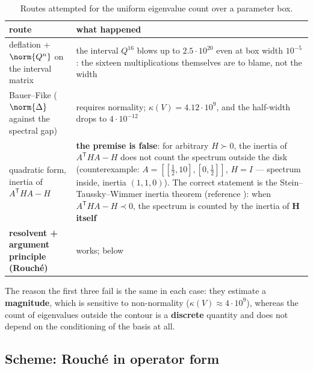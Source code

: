 \begin{table}[ht]
\centering
\caption{Routes attempted for the uniform eigenvalue count over a parameter box.}
\label{tab:routes}
\begin{tabular}{@{}p{}p{}@{}}
\toprule
route & what happened \\
\midrule
deflation + $\norm{Q^{n}}$ on the interval matrix &
the interval $Q^{16}$ blows up to $2.5\cdot 10^{20}$ even at box width
$10^{-5}$: the sixteen multiplications themselves are to blame, not the
width \\
\addlinespace
Bauer--Fike ($\norm{\Delta}$ against the spectral gap) &
requires normality; $\kappa(V) = 4.12\cdot 10^{9}$, and the half-width
drops to $4\cdot 10^{-12}$ \\
\addlinespace
quadratic form, inertia of $A^{\mathsf{T}}HA - H$ &
\textbf{the premise is false}: for arbitrary $H \succ 0$, the inertia of
$A^{\mathsf{T}}HA - H$ does not count the spectrum outside the disk
(counterexample: $A = [[\tfrac{1}{2},10],[0,\tfrac{1}{2}]]$,
$H = I$ --- spectrum inside, inertia $(1,1,0)$). The correct statement is
the Stein--Taussky--Wimmer inertia theorem (reference \cite{stein1952theorems, taussky1964matrices, wimmer1973ostrowski, horn1991topics}): when
$A^{\mathsf{T}}HA - H \prec 0$, the spectrum is counted by the inertia of
$\mathbf{H}$ \textbf{itself} \\
\addlinespace
\textbf{resolvent + argument principle (Rouché)} &
works; below \\
\bottomrule
\end{tabular}
\end{table}

The reason the first three fail is the same in each case: they estimate a
\textbf{magnitude}, which is sensitive to non-normality ($\kappa(V) \approx 4\cdot 10^{9}$), whereas
the count of eigenvalues outside the contour is a \textbf{discrete} quantity and
does not depend on the conditioning of the basis at all.


\subsection{Scheme: Rouché in operator form}\label{sec:4.3}

